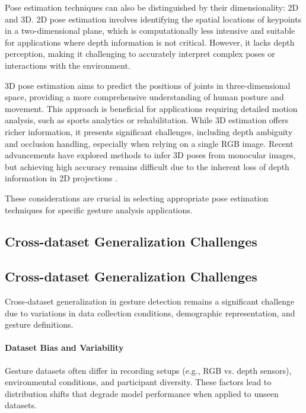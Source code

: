 Pose estimation techniques can also be distinguished by their dimensionality: 2D and 3D. 2D pose estimation involves identifying the spatial locations of keypoints in a two-dimensional plane, which is computationally less intensive and suitable for applications where depth information is not critical. However, it lacks depth perception, making it challenging to accurately interpret complex poses or interactions with the environment.

3D pose estimation aims to predict the positions of joints in three-dimensional space, providing a more comprehensive understanding of human posture and movement. This approach is beneficial for applications requiring detailed motion analysis, such as sports analytics or rehabilitation. While 3D estimation offers richer information, it presents significant challenges, including depth ambiguity and occlusion handling, especially when relying on a single RGB image. Recent advancements have explored methods to infer 3D poses from monocular images, but achieving high accuracy remains difficult due to the inherent loss of depth information in 2D projections \cite{3d_pose_estimation}.

These considerations are crucial in selecting appropriate pose estimation techniques for specific gesture analysis applications.


\subsection{Cross-dataset Generalization Challenges}\label{subsec:generalization}
\subsection{Cross-dataset Generalization Challenges}\label{subsec:generalization}

Cross-dataset generalization in gesture detection remains a significant challenge due to variations in data collection conditions, demographic representation, and gesture definitions. 

\paragraph{Dataset Bias and Variability} Gesture datasets often differ in recording setups (e.g., RGB vs. depth sensors), environmental conditions, and participant diversity. These factors lead to distribution shifts that degrade model performance when applied to unseen datasets.

